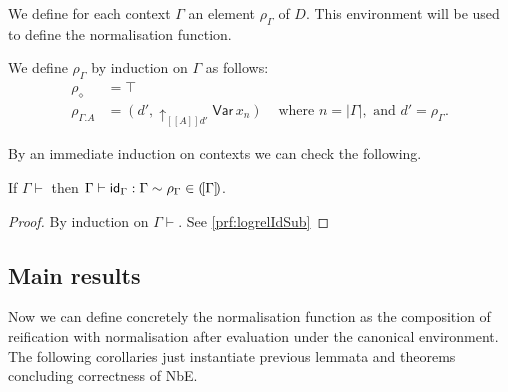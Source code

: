 \documentclass{LMCS}
\theoremstyle{plain}\newtheorem{satz}[thm]{Satz}
\newcommand{\LONGVERSION}[1]{#1}
\newcommand{\SHORTVERSION}[1]{}
\newcommand{\ctx}{\mathsf{Ctx}}
\newcommand{\ectx}{\diamond}
\newcommand{\ctxe}[2]{#1.#2}
\newcommand{\idsubs}[1]{\mathsf{id}_{#1}}
\newcommand{\dctx}[1]{#1\vdash}
\newcommand{\dsubs}[3]{#1\vdash#3:#2}
\newcommand{\upa}[2]{\mathop{\uparrow}\nolimits_{#1}{#2}}
\newcommand{\semc}[1]{[\![#1]\!]}
\newcommand{\rel}{\sim}
\newcommand{\iPair}[2]{(#1 , #2)}
\newcommand{\iVar}[1]{\mathsf{Var}\,x_{#1}}
\newcommand{\iO}{\top}
\newcommand{\LONGVERSION}[1]{}
\newcommand{\SHORTVERSION}[1]{#1}
\newcommand{\LONGSHORT}[2]{\LONGVERSION{#1}\SHORTVERSION{#2}}
\begin{document}
\LONGSHORT{ We define for each context $\Gamma$ an element
  $\rho_\Gamma$ of $D$. This environment will be used to define the
  normalisation function.

}{
We define for each context $\Gamma$ an element $\rho_\Gamma$ of $D$,
that is, by construction, logically related to $\idsubs{\Gamma}$. This
environment will be used to define the normalisation function; also
notice that if we instantiate Thm.~\ref{thm:logrel} with
$\rho_\Gamma$, then a well-typed term under $\Gamma$ will be logically
related to its denotation.
}
\begin{defi}
  \label{def:canonical-env}
\LONGSHORT{
We define $\rho_\Gamma$ by induction on $\Gamma$ as follows:
      \label{eq:env-ctx}
    \begin{align*}
      \rho_\ectx &=  \iO&\\
      \rho_{\ctxe{\Gamma}{A}} & =
      \iPair{d'}{\upa{\semc{A}{d'}}{\iVar{n}}}&    \mbox{ where } n =
      |\Gamma|, \mbox{ and } d' = \rho_\Gamma.
    \end{align*}
}{
  Let $\rho_\Gamma = P_\Gamma\ \iO$, where
      $P_\ectx \ d = d$ and
      $P_{\ctxe{\Gamma}{A}}\ d =
      \iPair{d'}{\upa{\semc{A}{d'}}{\iVar{|\Gamma|}}}$ with $d' = P_\Gamma\ d$.


Then $\dsubs{\Gamma}{\Gamma}{\idsubs{\Gamma}}\rel{\rho_\Gamma} \in
\semc{\Gamma}{}$ for $\Gamma \in \ctx$.
}
\end{defi}\medskip

\LONGVERSION{
\noindent By an immediate induction on contexts we can check the following.

\begin{lem}\label{lem:logrelIdSub} If $\dctx{\Gamma}$ then 
  $\dsubs{\Gamma}{\Gamma}{\idsubs{\Gamma}}\rel{\rho_\Gamma} \in
  \semctx{\Gamma}$. 
\end{lem}
\begin{proof}By induction on $\dctx{\Gamma}$. See \ref{prf:logrelIdSub}
\end{proof}

\subsection{Main results}

Now we can define concretely the normalisation function as the
composition of reification with normalisation after evaluation under
the canonical environment. The following corollaries just instantiate
previous lemmata and theorems concluding correctness of NbE.

}
\end{document}
